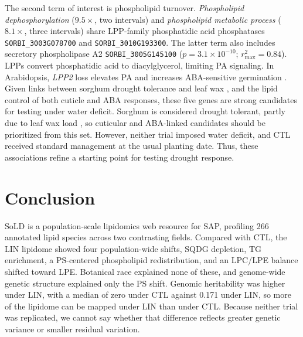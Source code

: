 \documentclass[9pt,twocolumn,twoside]{rilabRxiv}
\begin{document}
The second term of interest is phospholipid turnover. \textit{Phospholipid dephosphorylation} ($9.5\times$, two intervals) and \textit{phospholipid metabolic process} ($8.1\times$, three intervals) share LPP-family phosphatidic acid phosphatases \texttt{SORBI\_3003G078700} and \texttt{SORBI\_3010G193300}. The latter term also includes secretory phospholipase A2 \texttt{SORBI\_3005G145100} ($p = 3.1\times10^{-10}$; $r^2_{\max}=0.84$). LPPs convert phosphatidic acid to diacylglycerol, limiting PA signaling. In Arabidopsis, \textit{LPP2} loss elevates PA and increases ABA-sensitive germination \citep{Katagiri2005LPP2}. Given links between sorghum drought tolerance and leaf wax \citep{Busta2021, Fontanet2025SorghumDrought}, and the lipid control of both cuticle and ABA responses, these five genes are strong candidates for testing under water deficit. Sorghum is considered drought tolerant, partly due to leaf wax load \citep{Busta2021, Fontanet2025SorghumDrought}, so cuticular and ABA-linked candidates should be prioritized from this set. However, neither trial imposed water deficit, and CTL received standard management at the usual planting date. Thus, these associations refine a starting point for testing drought response.

\section*{Conclusion}

SoLD is a population-scale lipidomics web resource for SAP, profiling 266 annotated lipid species across two contrasting fields. Compared with CTL, the LIN lipidome showed four population-wide shifts, SQDG depletion, TG enrichment, a PS-centered phospholipid redistribution, and an LPC/LPE balance shifted toward LPE. Botanical race explained none of these, and genome-wide genetic structure explained only the PS shift. Genomic heritability was higher under LIN, with a median of zero under CTL against 0.171 under LIN, so more of the lipidome can be mapped under LIN than under CTL. Because neither trial was replicated, we cannot say whether that difference reflects greater genetic variance or smaller residual variation.
\end{document}
